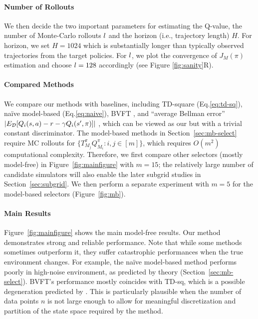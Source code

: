 \paragraph{Number of Rollouts} We then decide the two important parameters for estimating the Q-value, the number of Monte-Carlo rollouts $l$ and the horizon (i.e., trajectory length) $H$. %
For horizon, we set $H=1024$ which is substantially longer than typically observed trajectories from the target policies. %
For $l$, we plot the convergence of $J_M(\pi)$ estimation and choose $l=128$ accordingly (see Figure \ref{fig:sanity}R). 
%
%

%
%
%

\paragraph{Compared Methods}  We compare our methods with baselines, including TD-square (Eq.\eqref{eq:td-sq}), na\"ive model-based (Eq.\eqref{eq:naive}), BVFT \cite{zhang2021towards}, and ``average Bellman error'' $|E_{\mathcal{D}}[Q_i(s,a) - r - \gamma Q_i(s',\pi)]|$ \cite{jiang2017contextual}, which can be viewed as our \lstd but with a trivial constant discriminator. 
%
The model-based methods in Section~\ref{sec:mb-select} require MC rollouts for $\{T_{M_j}^\pi Q_{M_i}^\pi: i,j\in[m]\}$, which requires $O(m^2)$ computational complexity. Therefore, we first compare other selectors (mostly model-free) in Figure~\ref{fig:mainfigure} with  $m=15$; the relatively large number of candidate simulators will also enable the later subgrid studies in Section~\ref{sec:subgrid}. We then perform a separate experiment with $m=5$ for the model-based selectors (Figure~\ref{fig:mb}). 

\paragraph{Main Results} Figure~\ref{fig:mainfigure} shows the main model-free results. %
Our \lstd method demonstrates strong and reliable performance. Note that while some methods sometimes outperform it, they suffer catastrophic performances when the true environment changes. For example, the na\"ive model-based method performs poorly in high-noise environment, as predicted by theory (Section~\ref{sec:mb-select}). BVFT's performance mostly coincides with TD-sq, which is a possible degeneration predicted by \cite{zhang2021towards}. This is particularly plausible when the number of data points $n$ is not large enough to allow for meaningful discretization and partition of the state space required by the method. 

